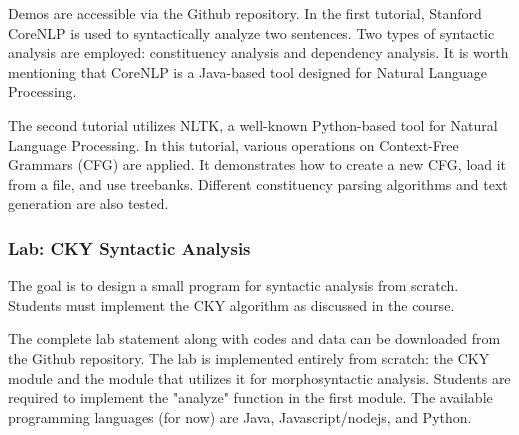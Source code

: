 \documentclass{KodeBook}
\begin{document}
Demos are accessible via the Github repository. In the first tutorial, Stanford CoreNLP is used to syntactically analyze two sentences. Two types of syntactic analysis are employed: constituency analysis and dependency analysis. It is worth mentioning that CoreNLP is a Java-based tool designed for Natural Language Processing.

The second tutorial utilizes NLTK, a well-known Python-based tool for Natural Language Processing. In this tutorial, various operations on Context-Free Grammars (CFG) are applied. It demonstrates how to create a new CFG, load it from a file, and use treebanks. Different constituency parsing algorithms and text generation are also tested.

\subsubsection*{Lab: CKY Syntactic Analysis}

The goal is to design a small program for syntactic analysis from scratch. Students must implement the CKY algorithm as discussed in the course.

The complete lab statement along with codes and data can be downloaded from the Github repository. The lab is implemented entirely from scratch: the CKY module and the module that utilizes it for morphosyntactic analysis. Students are required to implement the "analyze" function in the first module. The available programming languages (for now) are Java, Javascript/nodejs, and Python.


%
%
% 


\ifx\wholebook\relax\else
	
\end{document}
